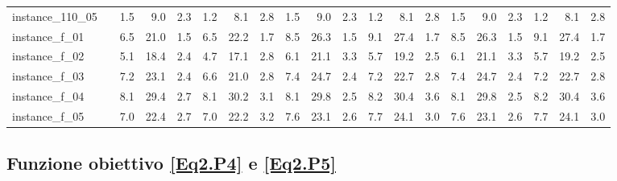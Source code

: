 \documentclass[12pt,a4paper,openright,twoside]{book}
\begin{document}
\begin{table}[H]
{\begin{tabular}{|ll|rrrrrr|rrrrrr|rrrrrr|}
instance\_110\_05             &     &   1.5  &   9.0  &  2.3  &   1.2  &   8.1  &  2.8  &      1.5  &   9.0  &  2.3  &   1.2  &   8.1  &  2.8   &     1.5  &   9.0  &  2.3  &   1.2  &   8.1  &  2.8   \\    
instance\_f\_01               &     &  6.5  &   21.0  &  1.5  &   6.5  &   22.2  &  1.7  &    8.5  &   26.3  &  1.5  &   9.1  &   27.4  &  1.7  &   8.5  &   26.3  &  1.5  &   9.1  &   27.4  &  1.7  \\    
instance\_f\_02               &     &   5.1  &   18.4  &  2.4  &   4.7  &   17.1  &  2.8  &    6.1  &   21.1  &  3.3  &   5.7  &   19.2  &  2.5  &    6.1  &   21.1  &  3.3  &   5.7  &   19.2  &  2.5  \\      
instance\_f\_03               &     &  7.2  &   23.1  &  2.4  &   6.6  &   21.0  &  2.8  &    7.4  &   24.7  &  2.4  &   7.2  &   22.7  &  2.8  &   7.4  &   24.7  &  2.4  &   7.2  &   22.7  &  2.8  \\     
instance\_f\_04               &     &   8.1  &   29.4  &  2.7  &   8.1  &   30.2  &  3.1  &    8.1  &   29.8  &  2.5  &   8.2  &   30.4  &  3.6  &    8.1  &   29.8  &  2.5  &   8.2  &   30.4  &  3.6  \\      
instance\_f\_05               &     &  7.0  &   22.4  &  2.7  &   7.0  &   22.2  &  3.2  &    7.6  &   23.1  &  2.6  &   7.7  &   24.1  &  3.0  &   7.6  &   23.1  &  2.6  &   7.7  &   24.1  &  3.0  \\   
 \hline
\end{tabular}
}
\end{table}

\subsection{Funzione obiettivo \texorpdfstring{\eqref{Eq2.P4}}{(5.26)} e \texorpdfstring{\eqref{Eq2.P5}}{(5.27)}}
\end{document}
